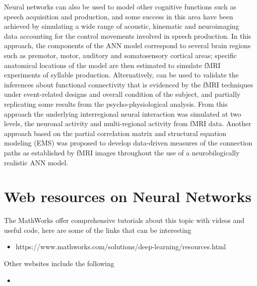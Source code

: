 \documentclass{WileySev}
\begin{document}
Neural networks can also be used to model other cognitive functions such as speech acquisition and production, and some success in this area have been achieved by simulating a wide range of acoustic, kinematic and neuroimaging data accounting for the control movements involved in speech production. In this approach, the components of the ANN model correspond to several brain regions such as premotor, motor, auditory and somatosensory cortical areas; specific anatomical locations of the model are then estimated to simulate fMRI experiments of syllable production. Alternatively, can be used to validate the inferences about functional connectivity that is evidenced by the fMRI techniques under event-related designs and overall condition of the subject, and partially replicating some results from the psycho-physiological analysis. From this approach the underlying interregional neural interaction was simulated at two levels, the neuronal activity and multi-regional activity from fMRI data.
Another approach based on the partial correlation matrix and structural equation modeling (EMS) was proposed to develop data-driven measures of the connection paths as established by fMRI images throughout the use of a neurobilogically realistic ANN model\cite{jiang2010medical}.


\chapter[Web resources on Neural Networks]
{Web resources on Neural Networks}

The MathWorks offer comprehensive tutorials about this topic with videos and useful code, here are some of the links that can be interesting

\begin{itemize}
  \item https://www.mathworks.com/solutions/deep-learning/resources.html
\end{itemize}

Other websites include the following

\begin{itemize}
  \item 
\end{itemize}





\end{document}
